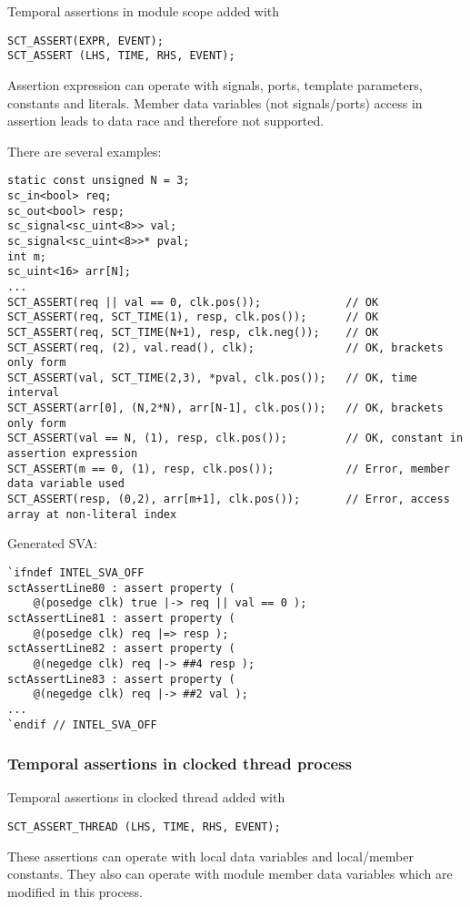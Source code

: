 Temporal assertions in module scope added with 

\begin{lstlisting}[style=mycpp]
SCT_ASSERT(EXPR, EVENT);
SCT_ASSERT (LHS, TIME, RHS, EVENT);
\end{lstlisting}
%
Assertion expression can operate with signals, ports, template parameters, constants and literals. Member data variables (not signals/ports) access in assertion leads to data race and therefore not supported. 

There are several examples:
\begin{lstlisting}[style=mycpp]
static const unsigned N = 3;
sc_in<bool> req;
sc_out<bool> resp;
sc_signal<sc_uint<8>> val;
sc_signal<sc_uint<8>>* pval;
int m;
sc_uint<16> arr[N];
...
SCT_ASSERT(req || val == 0, clk.pos());             // OK
SCT_ASSERT(req, SCT_TIME(1), resp, clk.pos());      // OK
SCT_ASSERT(req, SCT_TIME(N+1), resp, clk.neg());    // OK
SCT_ASSERT(req, (2), val.read(), clk);              // OK, brackets only form
SCT_ASSERT(val, SCT_TIME(2,3), *pval, clk.pos());   // OK, time interval
SCT_ASSERT(arr[0], (N,2*N), arr[N-1], clk.pos());   // OK, brackets only form
SCT_ASSERT(val == N, (1), resp, clk.pos());         // OK, constant in assertion expression 
SCT_ASSERT(m == 0, (1), resp, clk.pos());           // Error, member data variable used
SCT_ASSERT(resp, (0,2), arr[m+1], clk.pos());       // Error, access array at non-literal index
\end{lstlisting}
%
Generated SVA:
\begin{lstlisting}[style=myverilog]
`ifndef INTEL_SVA_OFF
sctAssertLine80 : assert property (
    @(posedge clk) true |-> req || val == 0 );
sctAssertLine81 : assert property (
    @(posedge clk) req |=> resp );
sctAssertLine82 : assert property (
    @(negedge clk) req |-> ##4 resp );
sctAssertLine83 : assert property (
    @(negedge clk) req |-> ##2 val );
...
`endif // INTEL_SVA_OFF
\end{lstlisting}

\subsubsection{Temporal assertions in clocked thread process}

Temporal assertions in clocked thread added with 
\begin{lstlisting}[style=mycpp]
SCT_ASSERT_THREAD (LHS, TIME, RHS, EVENT);
\end{lstlisting}
%
These assertions can operate with local data variables and local/member constants. They also can operate with module member data variables which are modified in this process.

